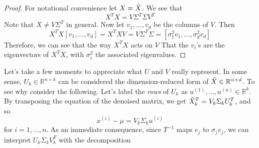   \begin{proof}
    For notational convenience let $X = \Tilde{X}$. We see that 
    \begin{equation}
      X^T X =  V \Sigma^T \Sigma V^T
    \end{equation}
    Note that $X \neq V \Sigma^T$ in general. Now let $v_1, \ldots, v_d$ be the columns of $V$. Then 
    \begin{equation}
      X^T X [v_1, \ldots, v_d] = X^T X V = V \Sigma^T \Sigma = [\sigma_1^2 v_1, \ldots, \sigma_d^2 v_d]
    \end{equation}
    Therefore, we can see that the way $X^T X$ acts on $V$ That the $v_i$'s are the eigenvectors of $X^T X$, with $\sigma_i^2$ the associated eigenvalues. 
  \end{proof}

  Let's take a few moments to appreciate what $U$ and $V$ really represent. In some sense, $U_k \in \mathbb{R}^{n \times k}$ can be considered the dimension-reduced form of $\Tilde{X} \in \mathbb{R}^{n \times d}$. To see why consider the following. Let's label the \textit{rows} of $U_k$ as $u^{(1)}, \ldots, u^{(n)} \in \mathbb{R}^k$. By transposing the equation of the denoised matrix, we get $\Tilde{X}_k^T = V_k \Sigma_k U_k^T$, and so 
  \begin{equation}
    x^{(i)} - \mu = V_k \Sigma_k u^{(i)}
  \end{equation}
  for $i = 1, \ldots, n$. As an immediate consequence, since $T^{-1}$ maps $e_j$ to $\sigma_j v_j$, we can interpret $U_k \Sigma_k V_k^T$ with the decomposition 
  \begin{center}
  \end{center}

